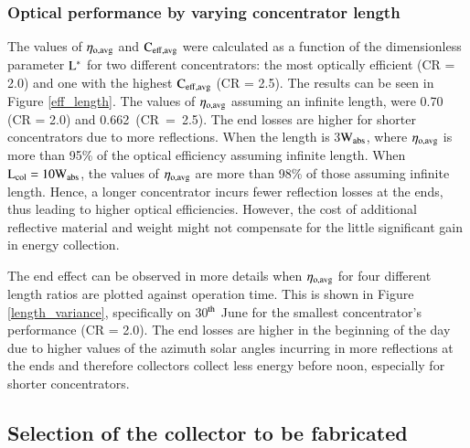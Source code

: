 
\subsubsection{Optical performance by varying concentrator length} 

The values of ${\rm \eta_{o,avg}}$ and $\rm{C_{eff,avg}}$ were calculated as a function of the dimensionless parameter $\rm{L^{*}}$ for two different concentrators: the most optically efficient (CR = 2.0) and one with the highest $\rm{C_{eff,avg}}$ (CR = 2.5). The results can be seen in Figure \ref{eff_length}. The values of ${\rm \eta_{o,avg}}$ assuming an infinite length, were 0.70 (CR = 2.0) and \mbox{0.662 (CR = 2.5)}. The end losses are higher for shorter concentrators due to more reflections. When the length is 3$\rm W_{abs}$, where $\rm \eta_{o,avg}$ is more than 95\% of the optical efficiency assuming infinite length. When $\rm{L_{col} = 10W_{abs}}$, the values of $\rm{\eta_{o,avg}}$ are more than 98\% of those assuming infinite length. Hence, a longer concentrator incurs fewer reflection losses at the ends, thus leading to higher optical efficiencies. However, the cost of additional reflective material and weight might not compensate for the little significant gain in energy collection.


\newpage
The end effect can be observed in more details when ${\rm \eta_{o,avg}}$ for four different length ratios are plotted against operation time. This is shown in Figure \ref{length_variance}, specifically on 30$^{\rm th}$ June for the smallest concentrator's performance (CR = 2.0). The end losses are higher in the beginning of the day due to higher values of the azimuth solar angles incurring in more reflections at the ends and therefore collectors collect less energy before noon, especially for shorter concentrators. 


\subsection{Selection of the collector to be fabricated}

